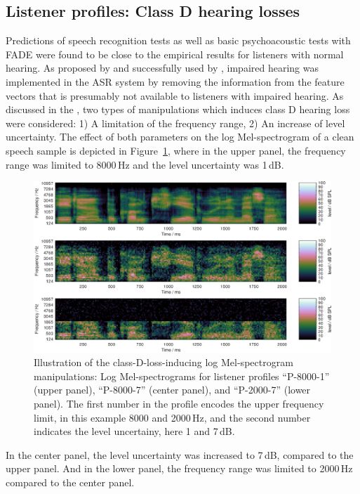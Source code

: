 \documentclass[10pt,a4paper,twocolumn]{article}
\begin{document}
\subsection*{Listener profiles: Class D hearing losses}
\label{sec:listenerprofiles}
%
Predictions of speech recognition tests as well as basic psychoacoustic tests with FADE were found to be close to the empirical results for listeners with normal hearing.
%
As proposed by \cite{kollmeier2016} and successfully used by \cite{schaedler2020a}, impaired hearing was implemented in the ASR system by removing the information from the feature vectors that is presumably not available to listeners with impaired hearing.
%
As discussed in the , two types of manipulations  which induces class D hearing loss were considered: 1) A limitation of the frequency range, 2) An increase of level uncertainty.
%
The effect of both parameters on the log Mel-spectrogram of a clean speech sample is depicted in Figure~\ref{fig:4}, where in the upper panel, the frequency range was limited to 8000\,Hz and the level uncertainty was 1\,dB.
%
\begin{figure}[h]
	\centerline{\includegraphics[width=1.0\textwidth]{images/leveluncertainty-bandwidth}}
	\caption{Illustration of the class-D-loss-inducing log Mel-spectrogram manipulations: Log Mel-spectrograms for listener profiles \enquote{P-8000-1} (upper panel), \enquote{P-8000-7} (center panel), and \enquote{P-2000-7} (lower panel).
	The first number in the profile encodes the upper frequency limit, in this example 8000 and 2000\,Hz, and the second number indicates the level uncertainy, here 1 and 7\,dB.}
	\label{fig:4}
\end{figure}
%
In the center panel, the level uncertainty was increased to 7\,dB, compared to the upper panel.
%
And in the lower panel, the frequency range was limited to 2000\,Hz compared to the center panel.
\end{document}

